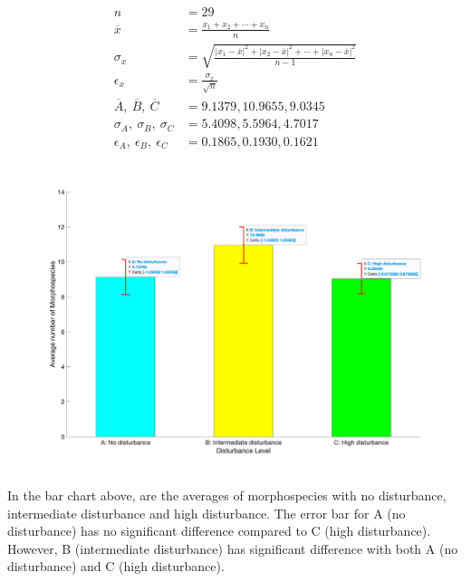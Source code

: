 \documentclass{article}
\begin{document}
\begin{table}[h!]
  \begin{center}
    \begin{equation}
      \begin{split}
        n &= 29 \\
        \overline{x} &= \frac{x_1 + x_2 + \cdots + x_n}{n} \\
        \sigma_{x} &= \sqrt{\frac{{|x_1 - \overline{x}|}^2 + {|x_2 - \overline{x}|}^2 + \cdots + {|x_n - \overline{x}|}^2}{n-1}} \\
        \epsilon_{x} &= \frac{\sigma_{x}}{\sqrt{n}} \\
        \overline{A},~\overline{B},~\overline{C} &= 9.1379, 10.9655, 9.0345 \\
        \sigma_{A},~\sigma_{B},~\sigma_{C} &= 5.4098, 5.5964, 4.7017 \\
        \epsilon_{A},~\epsilon_{B},~\epsilon_{C} &= 0.1865, 0.1930, 0.1621 \\
      \end{split}
    \end{equation}
  \end{center}
\end{table}
\newpage
\begin{center}
  \includegraphics[width=\textwidth]{idh.jpg}
\end{center}
In the bar chart above, are the averages of morphospecies with no disturbance, intermediate disturbance and high disturbance. The error bar for A (no disturbance) has no significant difference compared to C (high disturbance). However, B (intermediate disturbance) has significant difference with both A (no disturbance) and C (high disturbance).
\end{document}
